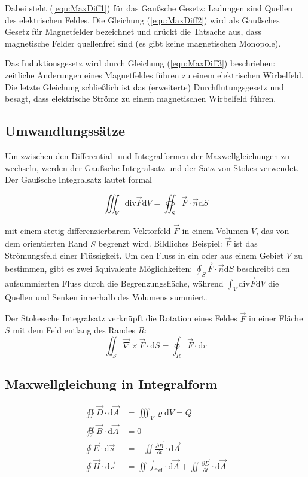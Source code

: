 \documentclass[a4paper]{scrartcl}
\begin{document}
Dabei steht (\ref{equ:MaxDiff1}) für das Gaußsche Gesetz: Ladungen sind Quellen des elektrischen Feldes. Die Gleichung (\ref{equ:MaxDiff2}) wird als Gaußsches Gesetz für Magnetfelder bezeichnet und drückt die Tatsache aus, dass magnetische Felder quellenfrei sind (es gibt keine magnetischen Monopole).

Das Induktionsgesetz wird durch Gleichung (\ref{equ:MaxDiff3}) beschrieben: zeitliche Änderungen eines Magnetfeldes führen zu einem elektrischen Wirbelfeld. Die letzte Gleichung schließlich ist das (erweiterte) Durchflutungsgesetz und besagt, dass elektrische Ströme zu einem magnetischen Wirbelfeld führen.

\subsection{Umwandlungssätze}
Um zwischen den Differential- und Integralformen der Maxwellgleichungen zu wechseln, werden der Gaußsche Integralsatz und der Satz von Stokes verwendet. Der Gaußsche Integralsatz lautet formal

\begin{equation*}
  \iiint_V \text{div} \vec F \text{d}V = \oiint_S \vec F \cdot \vec n \text{d}S
\end{equation*}

mit einem stetig differenzierbarem Vektorfeld $\vec F$ in einem Volumen $V$, das von dem orientierten Rand $S$ begrenzt wird. Bildliches Beispiel: $\vec F$ ist das Strömungsfeld einer Flüssigkeit. Um den Fluss in ein oder aus einem Gebiet $V$ zu bestimmen, gibt es zwei äquivalente Möglichkeiten: $\oint_S \vec F \cdot \vec n \text{d}S$ beschreibt den aufsummierten Fluss durch die Begrenzungsfläche, während $\int_V \text{div} \vec F \text{d}V$ die Quellen und Senken innerhalb des Volumens summiert.

Der Stokessche Integralsatz verknüpft die Rotation eines Feldes $\vec F$ in einer Fläche $S$ mit dem Feld entlang des Randes $R$:
\begin{equation*}
  \iint_S \vec \nabla \times \vec F \cdot \text{d}S = \oint_R \vec F \cdot \text{d}r
\end{equation*}

\subsection{Maxwellgleichung in Integralform}
\begin{align}
  \label{equ:MaxInt1} \oiint \vec D \cdot \text{d}\vec A & = \iiint_V \varrho \text{d}V  = Q \tag{M1i}\\
  \label{equ:MaxInt2} \oiint \vec B \cdot \text{d}\vec A & = 0 \tag{M2i}\\
  \label{equ:MaxInt3} \oint \vec E \cdot \text{d} \vec s & = - \iint \frac{\partial \vec B}{\partial t} \cdot \text{d}\vec A \tag{M3i}\\
  \label{equ:MaxInt4} \oint \vec H \cdot \text{d}\vec s & = \iint \vec j_\text{frei} \cdot \text{d}\vec A + \iint \frac{\partial \vec D}{\partial t} \cdot \text{d}\vec A \tag{M4i}
\end{align}
\end{document}

